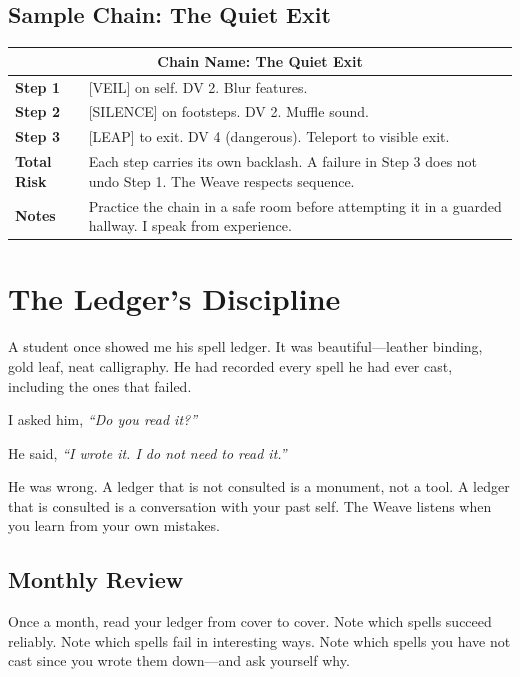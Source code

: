 \subsection{Sample Chain: The Quiet Exit}

\noindent
\begin{tabular}{|p{}|p{}|}
\hline
\multicolumn{2}{|c|}{\textbf{Chain Name: The Quiet Exit}}\\
\hline
\textbf{Step 1} & [VEIL] on self. DV 2. Blur features. \\
\textbf{Step 2} & [SILENCE] on footsteps. DV 2. Muffle sound. \\
\textbf{Step 3} & [LEAP] to exit. DV 4 (dangerous). Teleport to visible exit. \\
\hline
\textbf{Total Risk} & Each step carries its own backlash. A failure in Step 3 does not undo Step 1. The Weave respects sequence. \\
\hline
\textbf{Notes} & Practice the chain in a safe room before attempting it in a guarded hallway. I speak from experience. \\
\hline
\end{tabular}

\section{The Ledger's Discipline}

A student once showed me his spell ledger. It was beautiful---leather binding, gold leaf, neat calligraphy. He had recorded every spell he had ever cast, including the ones that failed.

I asked him, \emph{``Do you read it?''}

He said, \emph{``I wrote it. I do not need to read it.''}

He was wrong. A ledger that is not consulted is a monument, not a tool. A ledger that is consulted is a conversation with your past self. The Weave listens when you learn from your own mistakes.

\subsection{Monthly Review}

Once a month, read your ledger from cover to cover. Note which spells succeed reliably. Note which spells fail in interesting ways. Note which spells you have not cast since you wrote them down---and ask yourself why.

